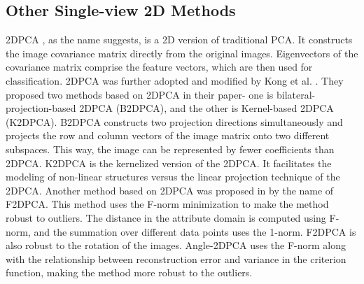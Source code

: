 \subsection{Other Single-view 2D Methods}
\label{subs:Lit_2D_Other}
2DPCA \cite{YangZFY04}, as the name suggests, is a 2D version of traditional PCA. It constructs the image covariance matrix directly from the original images. Eigenvectors of the covariance matrix comprise the feature vectors, which are then used for classification. 2DPCA was further adopted and modified by Kong et al. \cite{KongWTLWV05}. They proposed two methods based on 2DPCA in their paper- one is bilateral-projection-based 2DPCA (B2DPCA), and the other is Kernel-based 2DPCA (K2DPCA). B2DPCA constructs two projection directions simultaneously and projects the row and column vectors of the image matrix onto two different subspaces. This way, the image can be represented by fewer coefficients than 2DPCA. K2DPCA is the kernelized version of the 2DPCA. It facilitates the modeling of non-linear structures versus the linear projection technique of the 2DPCA. Another method based on 2DPCA was proposed in \cite{WangG17} by the name of F2DPCA. This method uses the F-norm minimization to make the method robust to outliers. The distance in the attribute domain is computed using F-norm, and the summation over different data points uses the 1-norm. F2DPCA is also robust to the rotation of the images. Angle-2DPCA \cite{GaoMLGN18} uses the F-norm along with the relationship between reconstruction error and variance in the criterion function, making the method more robust to the outliers.



















\chapterend
\cleardoublepage